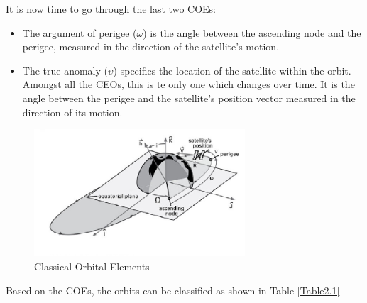 It is now time to go through the last two COEs:
\begin{itemize}
\item The argument of perigee ($\omega$) is the angle between the ascending node and the perigee, measured in the direction of the satellite's motion.
\item The true anomaly ($\upsilon$) specifies the location of the satellite within the orbit. Amongst all the CEOs, this is te only one which changes over time. It is the angle between the perigee and the satellite's position vector measured in the direction of its motion.
\end{itemize}

\begin{figure}[H]
\centerline{\includegraphics[width=0.7\textwidth]{images/COEs.png}}
\caption{Classical Orbital Elements \cite{IntAstr}}
\label{f2.3}
\end{figure}

Based on the COEs, the orbits can be classified as shown in Table \ref{Table2.1}

